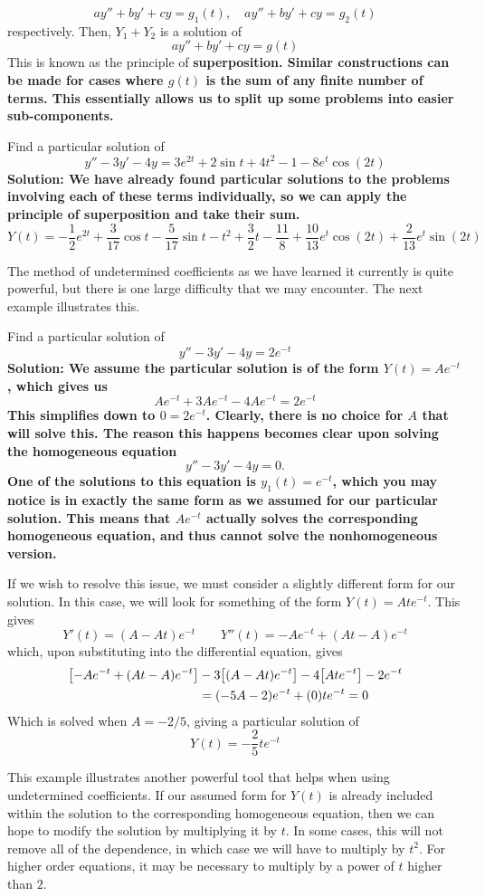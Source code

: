 \[ ay'' + by' + cy = g_1(t), \quad ay'' + by' + cy = g_2(t) \]
respectively. Then, $Y_1 + Y_2$ is a solution of
\[ ay'' + by' + cy = g(t) \]
This is known as the principle of \bf{superposition}. Similar constructions can be made for cases where $g(t)$ is the sum of any finite number of terms. This essentially allows us to split up some problems into easier sub-components.
\begin{example}
    Find a particular solution of
    \[ y'' - 3y' - 4y = 3e^{2t} + 2\sin t + 4t^2 - 1 - 8e^t\cos(2t) \]
    \bf{Solution:} We have already found particular solutions to the problems involving each of these terms individually, so we can apply the principle of superposition and take their sum.
    \[ Y(t) = -\frac{1}{2}e^{2t} + \frac{3}{17}\cos t - \frac{5}{17}\sin t - t^2 + \frac{3}{2}t - \frac{11}{8} + \frac{10}{13}e^t \cos(2t) + \frac{2}{13}e^t\sin(2t) \]
\end{example}
The method of undetermined coefficients as we have learned it currently is quite powerful, but there is one large difficulty that we may encounter. The next example illustrates this.
\begin{example}
    Find a particular solution of
    \[ y'' - 3y' - 4y = 2e^{-t} \]
    \bf{Solution:} We assume the particular solution is of the form $Y(t) = Ae^{-t}$, which gives us
    \[ Ae^{-t} + 3Ae^{-t} - 4Ae^{-t} = 2e^{-t} \]
    This simplifies down to $0 = 2e^{-t}$. Clearly, there is no choice for $A$ that will solve this. The reason this happens becomes clear upon solving the homogeneous equation
    \[ y'' - 3y' - 4y = 0. \]
    One of the solutions to this equation is $y_1(t) = e^{-t}$, which you may notice is in exactly the same form as we assumed for our particular solution. This means that $Ae^{-t}$ actually solves the corresponding homogeneous equation, and thus cannot solve the nonhomogeneous version. \par
    If we wish to resolve this issue, we must consider a slightly different form for our solution. In this case, we will look for something of the form $Y(t) = Ate^{-t}$. This gives
    \[ Y'(t) = (A-At)e^{-t} \quad \quad Y''(t) = -Ae^{-t} + (At-A)e^{-t}\]
    which, upon substituting into the differential equation, gives
    \begin{align*}
        \bqty{-Ae^{-t} + (At-A)e^{-t}} &- 3\bqty{(A-At)e^{-t}} - 4\bqty{Ate^{-t}} - 2e^{-t} \\
        &= \pqty{-5A - 2}e^{-t} + \pqty{0}te^{-t} = 0
    \end{align*}
    Which is solved when $A = -2/5$, giving a particular solution of
    \[ Y(t) = -\frac{2}{5}te^{-t} \]
\end{example}
This example illustrates another powerful tool that helps when using undetermined coefficients. If our assumed form for $Y(t)$ is already included within the solution to the corresponding homogeneous equation, then we can hope to modify the solution by multiplying it by $t$. In some cases, this will not remove all of the dependence, in which case we will have to multiply by $t^2$. For higher order equations, it may be necessary to multiply by a power of $t$ higher than $2$. 
